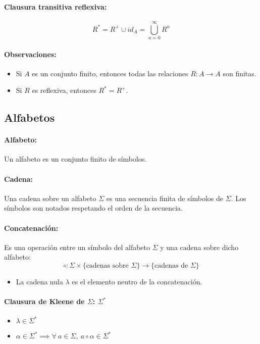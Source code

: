 \paragraph{Clausura transitiva reflexiva:} \[ R^* = R^+ \cup id_A = \bigcup_{n=0}^\infty R^n\]

\paragraph{Observaciones:}
\begin{itemize}
  \item Si \(A\) es un conjunto finito, entonces todas las relaciones \(R:A\to A\) son finitas.
  \item Si \(R\) es reflexiva, entonces \(R^* = R^+\).
\end{itemize}



\subsection{Alfabetos}
\paragraph{Alfabeto:} Un alfabeto es un conjunto finito de símbolos.

\paragraph{Cadena:} Una cadena sobre un alfabeto \(\Sigma\) es una secuencia finita de símbolos de \(\Sigma\). Los símbolos son notados respetando el orden de la secuencia.

\paragraph{Concatenación:} Es una operación entre un símbolo del alfabeto \(\Sigma\) y una cadena sobre dicho alfabeto:
\[ \circ : \Sigma\times\{\text{cadenas sobre }\Sigma\}\to\{\text{cadenas de }\Sigma\}\]
\begin{itemize}
  \item La cadena nula \(\lambda\) es el elemento neutro de la concatenación.
\end{itemize}

\paragraph{Clausura de Kleene de \(\Sigma\): \(\Sigma^*\)}
\begin{itemize}
  \item \(\lambda\in\Sigma^*\)
  \item \(\alpha\in\Sigma^*\implies \forall~a\in\Sigma,~a\circ\alpha\in\Sigma^*\)
\end{itemize}

